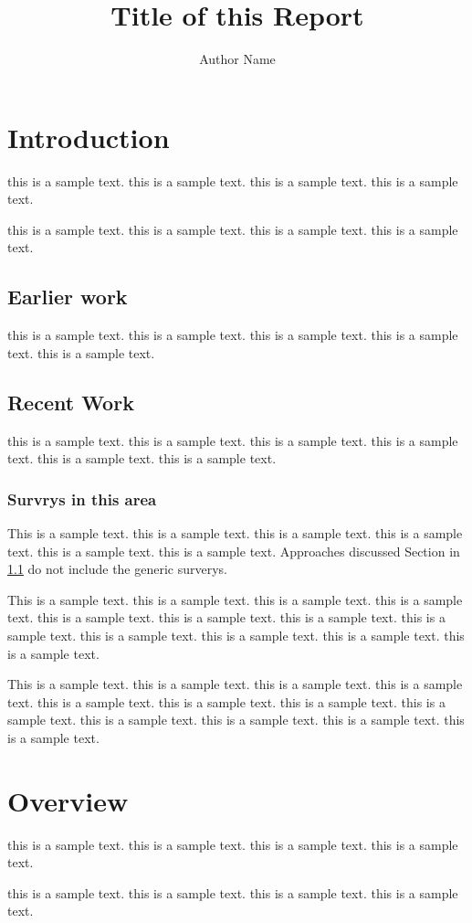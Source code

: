 \documentclass[titlepage,twocolumn,12pt]{article}
\title{Title of this Report}
\author {Author Name}
\begin{document}
\maketitle

\section{Introduction}

this is  a sample text.  this is  a sample text.  this is  a sample text.  this is  a sample text.  






this is  a sample text.
this is  a sample text.
this is  a sample text.
this is  a sample text.

\subsection{Earlier work} \label{ew}

this is  a sample text.
this is  a sample text.
this is  a sample text.
this is  a sample text.
this is  a sample text.

\subsection{Recent Work}

this is  a sample text.
this is  a sample text.
this is  a sample text.
this is  a sample text.
this is  a sample text.
this is  a sample text.

\subsubsection{Survrys in this area}

This is  a sample text.
this is  a sample text.
this is  a sample text.
this is  a sample text.
this is  a sample text.
this is  a sample text.
Approaches discussed Section in \ref{ew} do not include
the generic surverys.

This is  a sample text.
this is  a sample text.
this is  a sample text.
this is  a sample text.
this is  a sample text.
this is  a sample text.
this is  a sample text.
this is  a sample text.
this is  a sample text.
this is  a sample text.
this is  a sample text.
this is  a sample text.

 
\vspace{1mm}
\noindent
This is  a sample text.
this is  a sample text.
this is  a sample text.
this is  a sample text.
this is  a sample text.
this is  a sample text.
this is  a sample text.
this is  a sample text.
this is  a sample text.
this is  a sample text.
this is  a sample text.
this is  a sample text.


\section {Overview }

this is  a sample text.
this is  a sample text.
this is  a sample text.
this is  a sample text.

this is  a sample text.
this is  a sample text.
this is  a sample text.
this is  a sample text.
\end{document}
